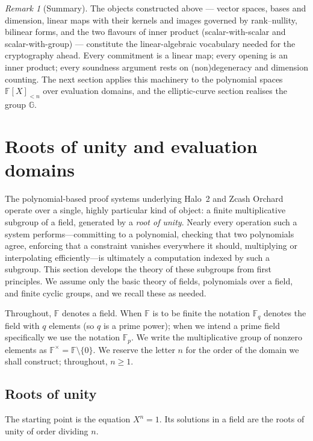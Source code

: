 \documentclass[11pt,a4paper]{article}
\theoremstyle{definition}
\theoremstyle{remark}
\newtheorem{remark}[theorem]{Remark}
\newcommand{\F}{\ensuremath{\mathbb{F}}}
\newcommand{\G}{\ensuremath{\mathbb{G}}}
\newcommand{\Fp}{\ensuremath{\mathbb{F}_{p}}}
\newcommand{\Fq}{\ensuremath{\mathbb{F}_{q}}}
\begin{document}
\begin{remark}[Summary]\label{linalg:rem-summary}
The objects constructed above — vector spaces, bases and dimension, linear maps with their kernels and images governed by rank--nullity, bilinear forms, and the two flavours of inner product (scalar-with-scalar and scalar-with-group) — constitute the linear-algebraic vocabulary needed for the cryptography ahead. Every commitment is a linear map; every opening is an inner product; every soundness argument rests on (non)degeneracy and dimension counting. The next section applies this machinery to the polynomial spaces \(\F[X]_{<n}\) over evaluation domains, and the elliptic-curve section realises the group \(\G\).
\end{remark}

\clearpage

\section{Roots of unity and evaluation domains}\label{sec:rootsofunity}

The polynomial-based proof systems underlying Halo~2 and Zcash Orchard operate over a single, highly particular kind of object: a finite multiplicative subgroup of a field, generated by a \emph{root of unity}. Nearly every operation such a system performs---committing to a polynomial, checking that two polynomials agree, enforcing that a constraint vanishes everywhere it should, multiplying or interpolating efficiently---is ultimately a computation indexed by such a subgroup. This section develops the theory of these subgroups from first principles. We assume only the basic theory of fields, polynomials over a field, and finite cyclic groups, and we recall these as needed.

Throughout, \(\F\) denotes a field. When \(\F\) is to be finite the notation \(\Fq\) denotes the field with \(q\) elements (so \(q\) is a prime power); when we intend a prime field specifically we use the notation \(\Fp\). We write the multiplicative group of nonzero elements as \(\F^\times = \F \setminus \{0\}\). We reserve the letter \(n\) for the order of the domain we shall construct; throughout, \(n \ge 1\).

\subsection{Roots of unity}

The starting point is the equation \(X^n = 1\). Its solutions in a field are the roots of unity of order dividing \(n\).
\end{document}
